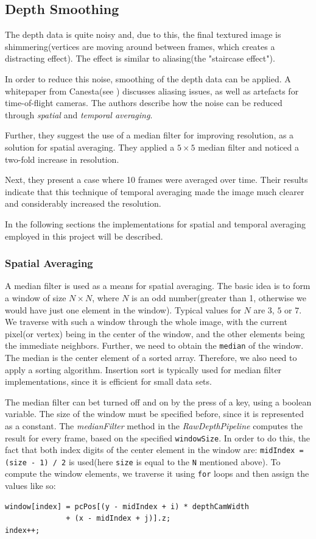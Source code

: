 \documentclass[]{article}
\begin{document}
\subsection{Depth Smoothing}

The depth data is quite noisy and, due to this, the final textured image is shimmering(vertices are moving around between frames, which creates a distracting effect). The effect is similar to aliasing(the "staircase effect").

In order to reduce this noise, smoothing of the depth data can be applied. A whitepaper from Canesta(see \cite{gokturk}) discusses aliasing issues, as well as artefacts for time-of-flight cameras. The authors describe how the noise can be reduced through \textit{spatial} and \textit{temporal averaging}. 

Further, they suggest the use of a median filter for improving resolution, as a solution for spatial averaging. They applied a $5 \times 5$ median filter and noticed a two-fold increase in resolution. 

Next, they present a case where 10 frames were averaged over time. Their results indicate that this technique of temporal averaging made the image much clearer and considerably increased the resolution.

In the following sections the implementations for spatial and temporal averaging employed in this project will be described.

\subsubsection{Spatial Averaging}

A median filter is used as a means for spatial averaging. The basic idea is to form a window of size $N \times N$, where $N$ is an odd number(greater than 1, otherwise we would have just one element in the window). Typical values for $N$ are $3$, $5$ or $7$. We traverse with such a window through the whole image, with the current pixel(or vertex) being in the center of the window, and the other elements being the immediate neighbors. Further, we need to obtain the \verb|median| of the window. The median is the center element of a sorted array. Therefore, we also need to apply a sorting algorithm. Insertion sort is typically used for median filter implementations, since it is efficient for small data sets.

The median filter can bet turned off and on by the press of a key, using a boolean variable. The size of the window must be specified before, since it is represented as a constant. The \textit{medianFilter} method in the \textit{RawDepthPipeline} computes the result for every frame, based on the specified \verb|windowSize|. In order to do this, the fact that both index digits of the center element in the window are: \verb|midIndex = (size - 1) / 2| is used(here \verb|size| is equal to the \verb|N| mentioned above). To compute the window elements, we traverse it using \verb|for| loops and then assign the values like so:
\begin{verbatim}
window[index] = pcPos[(y - midIndex + i) * depthCamWidth 
			  + (x - midIndex + j)].z;
index++;
\end{verbatim}
\end{document}
